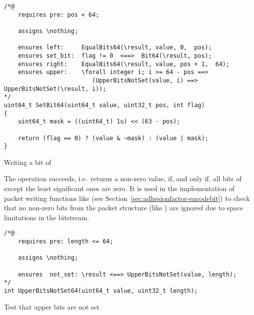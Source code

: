 \begin{listing}[hbt]
\begin{minipage}{0.99\textwidth}
\begin{lstlisting}[style=acsl-block]
/*@
    requires pre: pos < 64;

    assigns \nothing;

    ensures left:     EqualBits64(\result, value, 0,  pos);
    ensures set_bit:  flag != 0  <==>  Bit64(\result, pos);
    ensures right:    EqualBits64(\result, value, pos + 1,  64);
    ensures upper:    \forall integer i; i >= 64 - pos ==>
                         (UpperBitsNotSet(value, i) ==> UpperBitsNotSet(\result, i));
*/
uint64_t SetBit64(uint64_t value, uint32_t pos, int flag)
{
    uint64_t mask = ((uint64_t) 1u) << (63 - pos);

    return (flag == 0) ? (value & ~mask) : (value | mask);
}
\end{lstlisting}
\end{minipage}
\caption{\label{lst:SetBit64}Writing a bit of }
\end{listing}




The operation  succeeds,
i.e.\ returns a
non-zero value, if, and only if, all bits of  except
the least significant
 ones are zero.
%
It is used in the implementation of packet writing functions like
(see Section~\ref{sec:adhesionfactor-encodebit})
to check that no non-zero bits from the packet structure (like
) are ignored due to space
limitations in the bitstream.





\begin{listing}[hbt]
\begin{minipage}{0.99\textwidth}
\begin{lstlisting}[style=acsl-block]
/*@
    requires pre: length <= 64;

    assigns \nothing;

    ensures  not_set: \result <==> UpperBitsNotSet(value, length);
*/
int UpperBitsNotSet64(uint64_t value, uint32_t length);
\end{lstlisting}
\end{minipage}
\caption{\label{lst:UpperBitsNotSet64}Test that upper bits are not set}
\end{listing}
%











